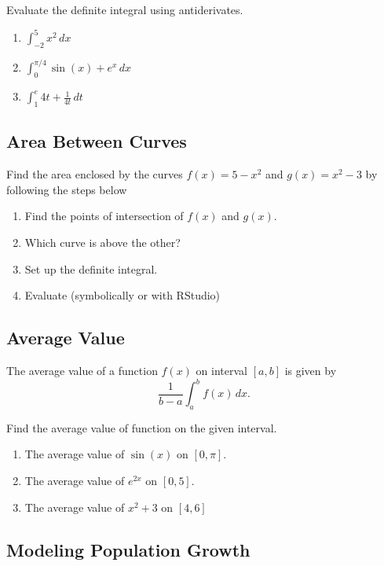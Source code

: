 \documentclass[
]{book}
\providecommand{\tightlist}{%
  \setlength{\itemsep}{0pt}\setlength{\parskip}{0pt}}
\begin{document}
Evaluate the definite integral using antiderivates.

\begin{enumerate}
\def\labelenumi{\arabic{enumi}.}
\tightlist
\item
  \(\displaystyle{\int_{-2}^5 x^2 \,dx}\)
\item
  \(\displaystyle{\int_0^{\pi/4} \sin(x) + e^{x}\,dx}\)
\item
  \(\displaystyle{\int_1^e 4t + \frac{1}{4t} \,dt}\)
\end{enumerate}

\hypertarget{area-between-curves-1}{%
\subsection{Area Between Curves}\label{area-between-curves-1}}

Find the area enclosed by the curves \(f(x)=5-x^2\) and \(g(x)=x^2-3\) by following the steps below

\begin{enumerate}
\def\labelenumi{\arabic{enumi}.}
\tightlist
\item
  Find the points of intersection of \(f(x)\) and \(g(x)\).
\item
  Which curve is above the other?
\item
  Set up the definite integral.
\item
  Evaluate (symbolically or with RStudio)
\end{enumerate}

\hypertarget{average-value}{%
\subsection{Average Value}\label{average-value}}

The average value of a function \(f(x)\) on interval \([a,b]\) is given by
\[ \frac{1}{b-a} \int_a^b f(x) \, dx.\]

Find the average value of function on the given interval.

\begin{enumerate}
\def\labelenumi{\arabic{enumi}.}
\tightlist
\item
  The average value of \(\sin(x)\) on \([0, \pi]\).
\item
  The average value of \(e^{2x}\) on \([0,5]\).
\item
  The average value of \(x^2 + 3\) on \([4,6]\)
\end{enumerate}

\hypertarget{modeling-population-growth}{%
\subsection{Modeling Population Growth}\label{modeling-population-growth}}
\end{document}
